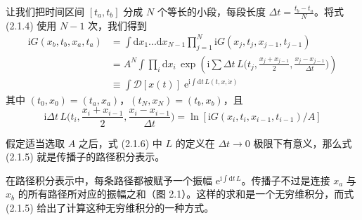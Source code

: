
让我们把时间区间 $[t_a,t_b]$ 分成 $N$ 个等长的小段，每段长度 $\Delta t = \frac{t_b-t_a}{N}$。将式 (2.1.4) 使用 $N-1$ 次，我们得到
\begin{align*}
\mathrm{i}G(x_b,t_b,x_a,t_a) &= \int \mathrm{d}x_1...\mathrm{d}x_{N-1} \prod_{j=1}^{N} \mathrm{i}G(x_j,t_j,x_{j-1},t_{j-1})\\
&= A^N \int \prod_i \mathrm{d}x_i\, \exp\left(\mathrm{i} \sum \Delta t\, L\Big(t_j, \frac{x_j+x_{j-1}}{2}, \frac{x_j-x_{j-1}}{\Delta t}\Big)\right)\\
&\equiv \int \mathcal{D}[x(t)]\; \mathrm{e}^{\mathrm{i}\int \mathrm{d}t\, L(t,x,\dot{x})} \tag{2.1.5}
\end{align*}
其中 $(t_0,x_0)=(t_a,x_a)$，$(t_N,x_N)=(t_b,x_b)$，且
\begin{equation*}
\mathrm{i}\Delta t\, L\Big(t_i, \frac{x_i+x_{i-1}}{2}, \frac{x_i-x_{i-1}}{\Delta t}\Big) = \ln[\mathrm{i}G(x_i,t_i,x_{i-1},t_{i-1})/A] \tag{2.1.6}
\end{equation*}

假定适当选取 $A$ 之后，式 (2.1.6) 中 $L$ 的定义在 $\Delta t \to 0$ 极限下有意义，那么式 (2.1.5) 就是传播子的路径积分表示。

在路径积分表示中，每条路径都被赋予一个振幅 $\mathrm{e}^{\mathrm{i}\int \mathrm{d}t\,L}$。传播子不过是连接 $x_a$ 与 $x_b$ 的所有路径所对应的振幅之和（图 2.1）。这样的求和是一个无穷维积分，而式 (2.1.5) 给出了计算这种无穷维积分的一种方式。

